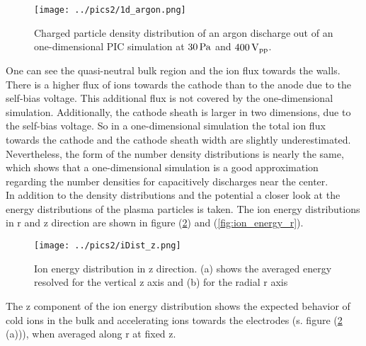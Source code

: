 \begin{figure}[htbp]
    \centering
    \texttt{[image: ../pics2/1d\_argon.png]}
    \caption{Charged particle density distribution of an argon discharge out of an one-dimensional PIC simulation at $30\,\mathrm{Pa}$ and $400\,\mathrm{V_{pp}}$.}
    \label{fig:dens_axis_argon}
\end{figure}
One can see the quasi-neutral bulk region and the ion flux towards the walls. 
There is a higher flux of ions towards the cathode than to the anode due to the self-bias voltage.
This additional flux is not covered by the one-dimensional simulation.
Additionally, the cathode sheath is larger in two dimensions, due to the self-bias voltage.
So in a one-dimensional simulation the total ion flux towards the cathode and the cathode sheath width are slightly underestimated.
Nevertheless, the form of the number density distributions is nearly the same, which shows that a one-dimensional simulation is a good approximation regarding the number densities for capacitively discharges near the center.\\
In addition to the density distributions and the potential a closer look at the energy distributions of the plasma particles is taken.
The ion energy distributions in r and z direction are shown in figure (\ref{fig:ion_energy_z}) and (\ref{fig:ion_energy_r}).
\begin{figure}[htbp]
    \centering
    \texttt{[image: ../pics2/iDist\_z.png]}
    \caption{Ion energy distribution in z direction. (a) shows the averaged energy resolved for the vertical z axis and (b) for the radial r axis }
    \label{fig:ion_energy_z}
\end{figure}
The z component of the ion energy distribution shows the expected behavior of cold ions in the bulk and accelerating ions towards the electrodes (s. figure (\ref{fig:ion_energy_z} (a))), when averaged along r at fixed z.
